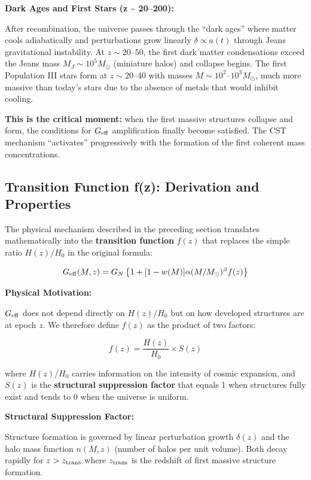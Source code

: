 \documentclass[11pt,a4paper]{article}
\begin{document}
\textbf{Dark Ages and First Stars (z \textasciitilde{} 20--200):}

After recombination, the universe passes through the ``dark ages'' where
matter cools adiabatically and perturbations grow linearly
\(\delta \propto a(t)\) through Jeans gravitational instability. At
\(z \sim 20\)--50, the first dark matter condensations exceed the Jeans
mass \(M_J \sim 10^5 M_\odot\) (miniature halos) and collapse begins.
The first Population III stars form at \(z \sim 20\)--40 with masses
\(M \sim 10^2\)--\(10^3 M_\odot\), much more massive than today's stars
due to the absence of metals that would inhibit cooling.

\textbf{This is the critical moment:} when the first massive structures
collapse and form, the conditions for \(G_{\rm eff}\) amplification
finally become satisfied. The CST mechanism ``activates'' progressively
with the formation of the first coherent mass concentrations.

\hypertarget{transition-function-fz-derivation-and-properties}{%
\subsection{Transition Function f(z): Derivation and
Properties}\label{transition-function-fz-derivation-and-properties}}

The physical mechanism described in the preceding section translates
mathematically into the \textbf{transition function} \(f(z)\) that
replaces the simple ratio \(H(z)/H_0\) in the original formula:

\[G_{\rm eff}(M,z) = G_N \left\{1 + [1-w(M)] \alpha (M/M_\odot)^\beta f(z)\right\}\]

\textbf{Physical Motivation:}

\(G_{\rm eff}\) does not depend directly on \(H(z)/H_0\) but on how
developed structures are at epoch \(z\). We therefore define \(f(z)\) as
the product of two factors:

\[f(z) = \frac{H(z)}{H_0} \times S(z)\]

where \(H(z)/H_0\) carries information on the intensity of cosmic
expansion, and \(S(z)\) is the \textbf{structural suppression factor}
that equals 1 when structures fully exist and tends to 0 when the
universe is uniform.

\textbf{Structural Suppression Factor:}

Structure formation is governed by linear perturbation growth
\(\delta(z)\) and the halo mass function \(n(M,z)\) (number of halos per
unit volume). Both decay rapidly for \(z > z_{\rm trans}\) where
\(z_{\rm trans}\) is the redshift of first massive structure formation.
\end{document}
